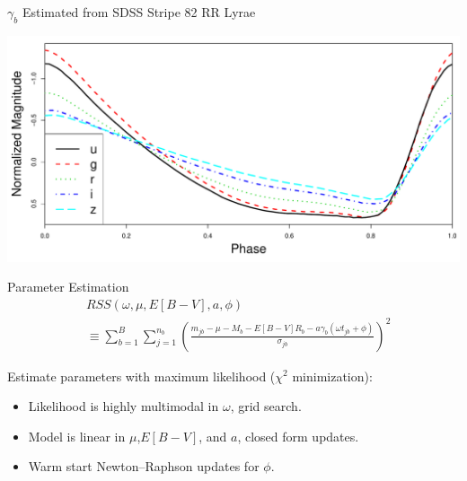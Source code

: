 \documentclass[12pt]{beamer}
\begin{document}
\begin{frame}{$\gamma_b$ Estimated from SDSS Stripe 82 RR Lyrae}

\begin{center}
\includegraphics[scale=.3]{figs/templates.pdf}
\end{center}

\end{frame}

\begin{frame}{Parameter Estimation}
\begin{align*}
&RSS(\omega,\mu,E[B-V],a,\phi) \\
 &\equiv\sum_{b=1}^B \sum_{j=1}^{n_b}\left(\frac{m_{jb} - \mu - M_b - E[B-V]R_b - a\gamma_b(\omega t_{jb} + \phi)}{\sigma_{jb}}\right)^2
\end{align*}


Estimate parameters with maximum likelihood ($\chi^2$ minimization):
\begin{itemize}
\item Likelihood is highly multimodal in $\omega$, grid search.
\item Model is linear in $\mu$,$E[B-V]$, and $a$, closed form updates.
\item Warm start Newton--Raphson updates for $\phi$.
\end{itemize}

\end{frame}
\end{document}
